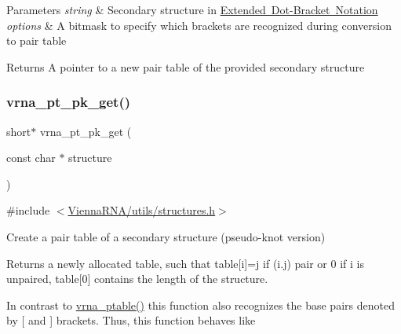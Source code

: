 \begin{DoxyParams}{Parameters}
{\em string} & Secondary structure in \mbox{\hyperlink{rna_structure_notations_dot-bracket-ext-notation}{Extended Dot-\/\+Bracket Notation}} \\
\hline
{\em options} & A bitmask to specify which brackets are recognized during conversion to pair table \\
\hline
\end{DoxyParams}
\begin{DoxyReturn}{Returns}
A pointer to a new pair table of the provided secondary structure 
\end{DoxyReturn}
\mbox{\label{group__struct__utils__pair__table_gacca520048b24ec5a8978f4dafb4e4bf8}} 
\subsubsection{\texorpdfstring{vrna\_pt\_pk\_get()}{vrna\_pt\_pk\_get()}}
{\footnotesize\ttfamily short$\ast$ vrna\+\_\+pt\+\_\+pk\+\_\+get (\begin{DoxyParamCaption}\item[{const char $\ast$}]{structure }\end{DoxyParamCaption})}



{\ttfamily \#include $<$\mbox{\hyperlink{utils_2structures_8h}{Vienna\+R\+N\+A/utils/structures.\+h}}$>$}



Create a pair table of a secondary structure (pseudo-\/knot version) 

Returns a newly allocated table, such that table\mbox{[}i\mbox{]}=j if (i.\+j) pair or 0 if i is unpaired, table\mbox{[}0\mbox{]} contains the length of the structure.

In contrast to \mbox{\hyperlink{group__struct__utils__pair__table_gae829fb8bb7f694c12a9c0bbc34c77c60}{vrna\+\_\+ptable()}} this function also recognizes the base pairs denoted by \textquotesingle{}\mbox{[}\textquotesingle{} and \textquotesingle{}\mbox{]}\textquotesingle{} brackets. Thus, this function behaves like 
\begin{DoxyCode}{0}
\end{DoxyCode}


